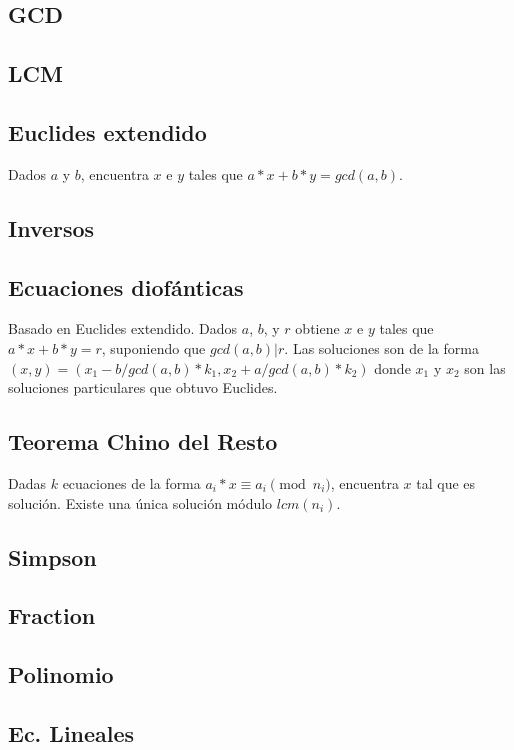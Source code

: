 \subsection{GCD}
\subsection{LCM}
\subsection{Euclides extendido}
Dados $a$ y $b$, encuentra $x$ e $y$ tales que $a*x + b*y = gcd(a, b)$.
\subsection{Inversos}
\subsection{Ecuaciones diofánticas}
Basado en Euclides extendido. Dados $a$, $b$, y $r$ obtiene $x$ e $y$ tales que $a*x + b*y = r$, suponiendo que $gcd(a,b) | r$. Las soluciones son de la forma $(x, y) = (x_1 - b/gcd(a,b) * k_1, x_2 + a/gcd(a,b) * k_2)$ donde $x_1$ y $x_2$ son las soluciones particulares que obtuvo Euclides.
\subsection{Teorema Chino del Resto}
Dadas $k$ ecuaciones de la forma $a_i*x \equiv a_i \pmod {n_i}$, encuentra $x$ tal que es solución. Existe una única solución módulo $lcm(n_i)$.
\subsection{Simpson}
\subsection{Fraction}
\subsection{Polinomio}
\subsection{Ec. Lineales}
